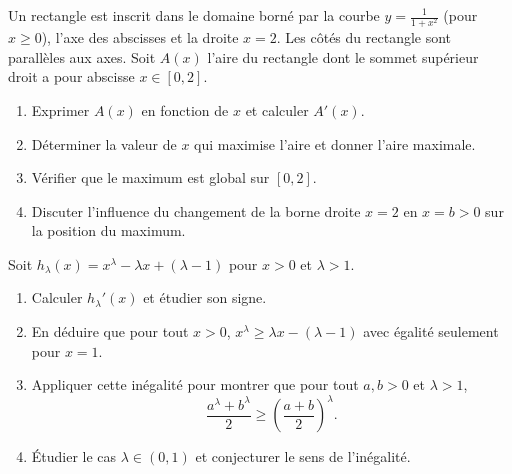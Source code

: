 \documentclass[11pt]{article}
\begin{document}
\begin{exercice}
Un rectangle est inscrit dans le domaine borné par la courbe $y=\frac{1}{1+x^2}$ (pour $x\ge 0$), l'axe des abscisses et la droite $x=2$. Les côtés du rectangle sont parallèles aux axes. Soit $A(x)$ l'aire du rectangle dont le sommet supérieur droit a pour abscisse $x\in[0,2]$.
\begin{enumerate}
\item Exprimer $A(x)$ en fonction de $x$ et calculer $A'(x)$.
\item Déterminer la valeur de $x$ qui maximise l'aire et donner l'aire maximale.
\item Vérifier que le maximum est global sur $[0,2]$.
\item Discuter l'influence du changement de la borne droite $x=2$ en $x=b>0$ sur la position du maximum.
\end{enumerate}
\end{exercice}

\begin{exercice}
Soit $h_\lambda(x)=x^\lambda-\lambda x+(\lambda-1)$ pour $x>0$ et $\lambda>1$.
\begin{enumerate}
\item Calculer $h_\lambda'(x)$ et étudier son signe.
\item En déduire que pour tout $x>0$, $x^\lambda\ge \lambda x-(\lambda-1)$ avec égalité seulement pour $x=1$.
\item Appliquer cette inégalité pour montrer que pour tout $a,b>0$ et $\lambda>1$,
\[
\frac{a^\lambda+b^\lambda}{2}\ge\left(\frac{a+b}{2}\right)^\lambda.
\]
\item Étudier le cas $\lambda\in(0,1)$ et conjecturer le sens de l'inégalité.
\end{enumerate}
\end{exercice}
\end{document}
